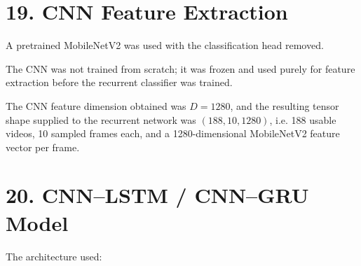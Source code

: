 \documentclass[10pt]{article}
\begin{document}
\section*{19. CNN Feature Extraction}

A pretrained MobileNetV2 was used with the classification head removed.

\begin{center}
\end{center}

The CNN was not trained from scratch; it was frozen and used purely for
feature extraction before the recurrent classifier was trained.

The CNN feature dimension obtained was $D=1280$, and the resulting tensor
shape supplied to the recurrent network was $(188, 10, 1280)$, i.e. 188
usable videos, 10 sampled frames each, and a 1280-dimensional MobileNetV2
feature vector per frame.

\section*{20. CNN--LSTM / CNN--GRU Model}

The architecture used:

\begin{center}
\end{center}
\end{document}
